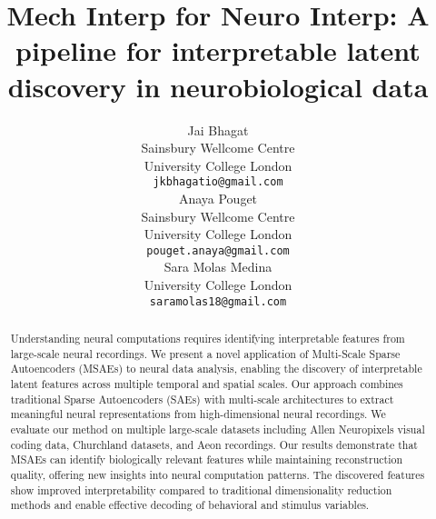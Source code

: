 \documentclass{article}
\title{
  Mech Interp for Neuro Interp: 
  A pipeline for interpretable latent discovery in neurobiological data
}
\author{%
  Jai Bhagat \\
  Sainsbury Wellcome Centre \\
  University College London \\
  \texttt{jkbhagatio@gmail.com} \\
  \And
  Anaya Pouget \\
  Sainsbury Wellcome Centre \\
  University College London \\
  \texttt{pouget.anaya@gmail.com} \\
  \And
  Sara Molas Medina \\
  University College London \\
  \texttt{saramolas18@gmail.com} \\
}
\begin{document}
\maketitle

\begin{abstract}
Understanding neural computations requires identifying interpretable features from large-scale neural recordings. We present a novel application of Multi-Scale Sparse Autoencoders (MSAEs) to neural data analysis, enabling the discovery of interpretable latent features across multiple temporal and spatial scales. Our approach combines traditional Sparse Autoencoders (SAEs) with multi-scale architectures to extract meaningful neural representations from high-dimensional neural recordings. We evaluate our method on multiple large-scale datasets including Allen Neuropixels visual coding data, Churchland datasets, and Aeon recordings. Our results demonstrate that MSAEs can identify biologically relevant features while maintaining reconstruction quality, offering new insights into neural computation patterns. The discovered features show improved interpretability compared to traditional dimensionality reduction methods and enable effective decoding of behavioral and stimulus variables.
\end{abstract}








\end{document}
